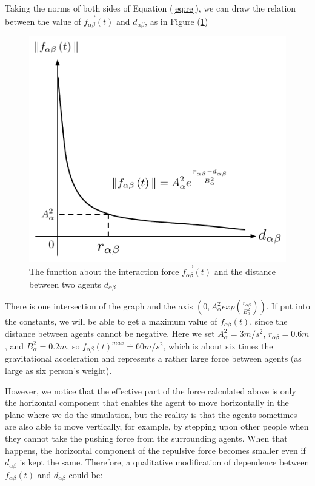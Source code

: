 Taking the norms of both sides of Equation (\ref{eq:re}), we can draw the relation 
between the value of $\overrightarrow{f_{\alpha\beta}}(t)$ and $d_{\alpha \beta}$, 
as in Figure (\ref{fig:physicalinteraction})
\\
\begin{figure}
\centering
\includegraphics[scale=0.45]{Figures/physicalinteraction.pdf} 
\caption{The function about the interaction force $\vec{f_{\alpha\beta}}(t)$ and the distance between two agents
$d_{\alpha\beta}$ }\label{fig:physicalinteraction}
\end{figure}

There is one intersection of the graph and the axis $ \left( 0, A_{\alpha}^{2} exp\left( \frac{r_{\alpha\beta} }{B_{\alpha}^{2}}\right)  \right) $. 
If put into the constants, we will be able to get a maximum value of $ f_{\alpha\beta}(t) $, 
since the distance between agents cannot be negative. Here we set $ A_{\alpha}^{2} = 3 m/s^{2} $, 
$ r_{\alpha\beta} = 0.6 m $, and $ B_{\alpha}^{2} = 0.2 m $, so $ f_{\alpha\beta}(t)^{max} \doteq 60 m/s^{2} $, 
which is about six times the gravitational acceleration and represents a rather 
large force between agents (as large as six person's weight).

However, we notice that the effective part of the force calculated above is only the horizontal 
component that enables the agent to move horizontally in the plane where we do the simulation, 
but the reality is that the agents sometimes are also able to move vertically, for example, 
by stepping upon other people when they cannot take the pushing force from the surrounding agents. 
When that happens, the horizontal component of the repulsive force becomes smaller even if 
$d_{\alpha\beta}$ is kept the same.	
Therefore, a qualitative modification of dependence between $ f_{\alpha\beta}(t) $ 
and $ d_{\alpha\beta} $ could be:

